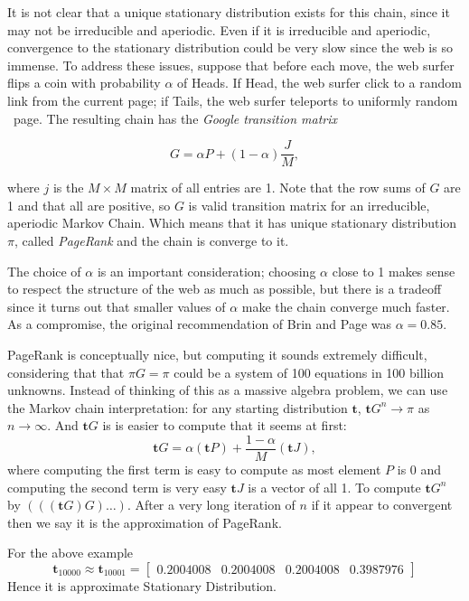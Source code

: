 It is not clear that a unique stationary distribution exists for this chain, 
since it may not be irreducible and aperiodic. 
Even if it is irreducible and aperiodic, convergence
to the stationary distribution could be very slow since the web is so immense. To
address these issues, suppose that before each move, the web surfer flips a coin
with probability $ \alpha $ of Heads. If Head, the web surfer click to a random 
link from the current page; if Tails, the web surfer teleports to uniformly random \
page. The resulting chain has the \textit{Google transition matrix}

\begin{equation}
    \label{google transition matrix}
    G = \alpha P + (1-\alpha) \frac{J}{M},
\end{equation}

where $ j $ is the  $ M\times M $ matrix of all entries are 1. Note that the row sums 
of $ G $ are 1 and that all are positive, so  $ G$ is valid transition matrix for an 
irreducible, aperiodic Markov Chain. Which means that it has unique stationary 
distribution $ \pi $, called \textit{PageRank} and the chain is converge to it.
 
The choice of $\alpha$ is an important consideration; 
choosing $ \alpha $ close to 1 makes sense to respect the structure of the
web as much as possible, but there is a tradeoff since it turns out that smaller
values of $ \alpha $ make the chain converge much faster. 
As a compromise, the original recommendation of Brin and Page was $\alpha = 0.85$.

PageRank is conceptually nice, but computing it sounds extremely difficult, considering
that that $ \pi G=\pi $ could be a system of 100 equations in 100 billion unknowns.
Instead of thinking of this as a massive algebra problem, we can use the Markov
chain interpretation: for any starting distribution  $ \mathbf{t} $,  
$\mathbf{t}G^{n}\to \pi$ as $ n\to\infty $. And $ \mathbf{t}G $ is is easier to 
compute that it seems at first:
 \[
     \mathbf{t}G = \alpha(\mathbf{t}P) +\frac{1-\alpha}{M}(\mathbf{t}J),
\]
where computing the first term is easy to compute as most element $ P $  is 0 and 
computing the second term is very easy $ \mathbf{t}J $ is a vector of all 1. 
To compute $ \mathbf{t}G^{n} $ by $ (((\mathbf{t}G)G)\ldots) $. After a very long 
iteration of $ n $ if it appear to convergent then we say  it is the approximation
of PageRank.

For the above example 
\[
    \mathbf{t}_{10000}\approx\mathbf{t}_{10001} = 
    \begin{bmatrix}
        0.2004008 & 0.2004008 & 0.2004008 & 0.3987976 
    \end{bmatrix} 
\]
Hence it is approximate Stationary Distribution.

